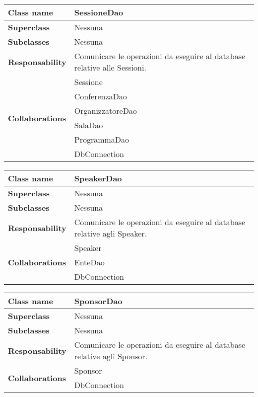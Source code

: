 \begin{table}[h!]
	\begin{tabular}{|l|l|}
		\hline 
		\textbf{Class name} & SessioneDao
		\\ \hline
		\textbf{Superclass} & Nessuna
		\\ \hline
		\multirow{1}{*}{\textbf{Subclasses}} & Nessuna
		\\ \hline
		\textbf{Responsability} & Comunicare le operazioni da eseguire al database relative alle Sessioni.
		\\ \hline
		\multirow{6}{*}{\textbf{Collaborations}} & Sessione \\ 
		& ConferenzaDao \\
		& OrganizzatoreDao \\
		& SalaDao \\
		& ProgrammaDao \\
		& DbConnection \\ \hline
	\end{tabular}
\end{table}
\newpage

\begin{table}[h!]
	\begin{tabular}{|l|l|}
		\hline 
		\textbf{Class name} & SpeakerDao
		\\ \hline
		\textbf{Superclass} & Nessuna
		\\ \hline
		\multirow{1}{*}{\textbf{Subclasses}} & Nessuna
		\\ \hline
		\textbf{Responsability} & Comunicare le operazioni da eseguire al database relative agli Speaker.
		\\ \hline
		\multirow{3}{*}{\textbf{Collaborations}} & Speaker \\ 
		& EnteDao \\
		& DbConnection \\ \hline
	\end{tabular}
\end{table}

\begin{table}[h!]
	\begin{tabular}{|l|l|}
		\hline 
		\textbf{Class name} & SponsorDao
		\\ \hline
		\textbf{Superclass} & Nessuna
		\\ \hline
		\multirow{1}{*}{\textbf{Subclasses}} & Nessuna
		\\ \hline
		\textbf{Responsability} & Comunicare le operazioni da eseguire al database relative agli Sponsor.
		\\ \hline
		\multirow{2}{*}{\textbf{Collaborations}} & Sponsor \\ 
		& DbConnection \\ \hline
	\end{tabular}
\end{table}

